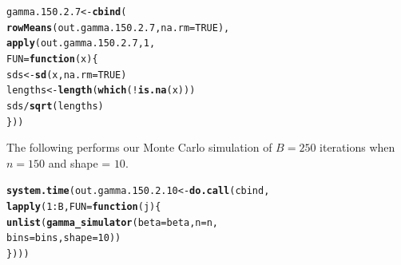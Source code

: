 \documentclass[11pt]{article}\usepackage[]{graphicx}\usepackage[]{color}
\makeatletter
\newcommand{\hlnum}[1]{\textcolor[rgb]{0.686,0.059,0.569}{#1}}%
\newcommand{\hlopt}[1]{\textcolor[rgb]{0,0,0}{#1}}%
\newcommand{\hlstd}[1]{\textcolor[rgb]{0.345,0.345,0.345}{#1}}%
\newcommand{\hlkwa}[1]{\textcolor[rgb]{0.161,0.373,0.58}{\textbf{#1}}}%
\newcommand{\hlkwb}[1]{\textcolor[rgb]{0.69,0.353,0.396}{#1}}%
\newcommand{\hlkwc}[1]{\textcolor[rgb]{0.333,0.667,0.333}{#1}}%
\newcommand{\hlkwd}[1]{\textcolor[rgb]{0.737,0.353,0.396}{\textbf{#1}}}%
\newenvironment{kframe}{%
 \def\at@end@of@kframe{}%
 \ifinner\ifhmode%
  \def\at@end@of@kframe{\end{minipage}}%
  \begin{minipage}{\columnwidth}%
 \fi\fi%
 \def\FrameCommand##1{\hskip\@totalleftmargin \hskip-\fboxsep
 \colorbox{shadecolor}{##1}\hskip-\fboxsep
     \hskip-\linewidth \hskip-\@totalleftmargin \hskip\columnwidth}%
 \MakeFramed {\advance\hsize-\width
   \@totalleftmargin\z@ \linewidth\hsize
   \@setminipage}}%
 {\par\unskip\endMakeFramed%
 \at@end@of@kframe}
\newenvironment{knitrout}{}{} %
\makeatother
\begin{document}
\begin{knitrout}
\color{fgcolor}\begin{kframe}
\begin{alltt}
\hlstd{gamma.150.2.7} \hlkwb{<-} \hlkwd{cbind}\hlstd{(}
  \hlkwd{rowMeans}\hlstd{(out.gamma.150.2.7,} \hlkwc{na.rm} \hlstd{=} \hlnum{TRUE}\hlstd{),}
  \hlkwd{apply}\hlstd{(out.gamma.150.2.7,} \hlnum{1}\hlstd{,}
  \hlkwc{FUN} \hlstd{=} \hlkwa{function}\hlstd{(}\hlkwc{x}\hlstd{)\{}
    \hlstd{sds} \hlkwb{<-} \hlkwd{sd}\hlstd{(x,} \hlkwc{na.rm} \hlstd{=} \hlnum{TRUE}\hlstd{)}
    \hlstd{lengths} \hlkwb{<-} \hlkwd{length}\hlstd{(}\hlkwd{which}\hlstd{(}\hlopt{!}\hlkwd{is.na}\hlstd{(x)))}
    \hlstd{sds} \hlopt{/} \hlkwd{sqrt}\hlstd{(lengths)}
  \hlstd{\}))}
\end{alltt}


{\ttfamily\noindent\bfseries\color{errorcolor}{\#\# Error in is.data.frame(x): object 'out.gamma.150.2.7' not found}}\end{kframe}
\end{knitrout}

The following performs our Monte Carlo simulation of $B = 250$ iterations 
when $n = 150$ and shape = $10$.

\begin{knitrout}
\color{fgcolor}\begin{kframe}
\begin{alltt}
\hlkwd{system.time}\hlstd{(out.gamma.150.2.10} \hlkwb{<-} \hlkwd{do.call}\hlstd{(cbind,}
  \hlkwd{lapply}\hlstd{(}\hlnum{1}\hlopt{:}\hlstd{B,} \hlkwc{FUN} \hlstd{=} \hlkwa{function}\hlstd{(}\hlkwc{j}\hlstd{)\{}
    \hlkwd{unlist}\hlstd{(}\hlkwd{gamma_simulator}\hlstd{(}\hlkwc{beta} \hlstd{= beta,} \hlkwc{n} \hlstd{= n,}
      \hlkwc{bins} \hlstd{= bins,} \hlkwc{shape} \hlstd{=} \hlnum{10}\hlstd{))}
\hlstd{\})))}
\end{alltt}


{\ttfamily\noindent\bfseries\color{errorcolor}{\#\# Error in eval(predvars, data, env): object 'x1' not found}}

{\ttfamily\noindent\itshape\color{messagecolor}{\#\# Timing stopped at: 0.002 0 0.003}}\end{kframe}
\end{knitrout}
\end{document}
